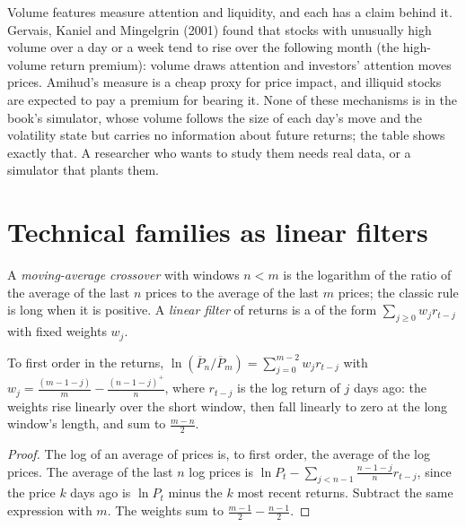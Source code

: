 Volume features measure attention and liquidity, and each has a claim behind it. Gervais, Kaniel and Mingelgrin (2001) found that
stocks with unusually high volume over a day or a week tend to rise over the following month (the high-volume return premium): volume
draws attention and investors' attention moves prices. Amihud's measure is a cheap proxy for price impact, and illiquid stocks are
expected to pay a premium for bearing it. None of these mechanisms is in the book's simulator, whose volume follows the size of each
day's move and the volatility state but carries no information about future returns; the table shows exactly that. A researcher who
wants to study them needs real data, or a simulator that plants them.

\section{Technical families as linear filters}

\begin{definition}\label{def:rs:price-and-volume-features:filter}
A \emph{moving-average crossover} with windows $n < m$ is the logarithm of the ratio of the average of
the last $n$ prices to the average of the last $m$ prices; the classic rule is long when it is positive. A \emph{linear
filter} of returns is a  of the form $\sum_{j \ge 0} w_jr_{t-j}$ with fixed weights $w_j$.
\end{definition}

\begin{proposition}\label{prop:rs:price-and-volume-features:crossover}
To first order in the returns, $\ln(\overline P_n/\overline P_m) = \sum_{j=0}^{m-2} w_jr_{t-j}$ with $w_j = \frac{(m - 1 - j)}{m} -
\frac{(n - 1 - j)^+}{n}$, where $r_{t-j}$ is the log return of $j$ days ago: the weights rise linearly over the short window, then fall
linearly to zero at the long window's length, and sum to $\frac{m - n}{2}$.
\end{proposition}

\begin{proof}
The log of an average of prices is, to first order, the average of the log prices. The average of the last $n$ log prices is $\ln P_t
- \sum_{j<n-1}\frac{n-1-j}{n}r_{t-j}$, since the price $k$ days ago is $\ln P_t$ minus the $k$ most recent returns. Subtract the
same expression with $m$. The weights sum to $\frac{m-1}{2} - \frac{n-1}{2}$.
\end{proof}

